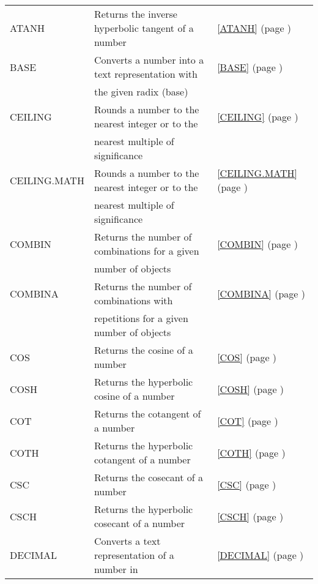 \begin{center}
\begin{longtable}{l l l }
		ATANH & Returns the inverse hyperbolic tangent of a number &  \ref{ATANH} (page \pageref{ATANH}) \index{Spreadsheet Functions!ATANH} \\
		BASE  & Converts a number into a text representation with &  \ref{BASE} (page \pageref{BASE}) \index{Spreadsheet Functions!BASE} \\
		& the given radix (base)  &   \\
		CEILING & Rounds a number to the nearest integer or to the &  \ref{CEILING} (page \pageref{CEILING}) \index{Spreadsheet Functions!CEILING} \\
		& nearest multiple of significance &   \\
		CEILING.MATH & Rounds a number to the nearest integer or to the &  \ref{CEILING.MATH} (page \pageref{CEILING.MATH}) \index{Spreadsheet Functions!CEILING.MATH} \\
		& nearest multiple of significance &   \\
		COMBIN & Returns the number of combinations for a given &  \ref{COMBIN} (page \pageref{COMBIN}) \index{Spreadsheet Functions!COMBIN} \\
		& number of objects &  \\
		COMBINA & Returns the number of combinations with &  \ref{COMBINA} (page \pageref{COMBINA}) \index{Spreadsheet Functions!COMBINA} \\
		& repetitions for a given number of objects &  \\
		COS   & Returns the cosine of a number &  \ref{COS} (page \pageref{COS}) \index{Spreadsheet Functions!COS} \\
		COSH  & Returns the hyperbolic cosine of a number &  \ref{COSH} (page \pageref{COSH}) \index{Spreadsheet Functions!COSH} \\
		COT   & Returns the cotangent of a number &  \ref{COT} (page \pageref{COT}) \index{Spreadsheet Functions!COT} \\
		COTH  & Returns the hyperbolic cotangent of a number &  \ref{COTH} (page \pageref{COTH}) \index{Spreadsheet Functions!COTH} \\
		CSC  & Returns the cosecant of a number &  \ref{CSC} (page \pageref{CSC}) \index{Spreadsheet Functions!CSC} \\
		CSCH  & Returns the hyperbolic cosecant of a number &  \ref{CSCH} (page \pageref{CSCH}) \index{Spreadsheet Functions!CSCH} \\
		DECIMAL & Converts a text representation of a number in &  \ref{DECIMAL} (page \pageref{DECIMAL}) \index{Spreadsheet Functions!DECIMAL} \\

\end{longtable}
\end{center}
